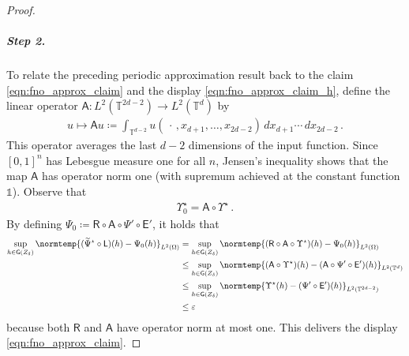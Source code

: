 \documentclass[pdflatex,sn-mathphys-num]{sn-jnl-preprint}
\newcommand{\T}{\mathbb{T}}
\newcommand{\sfA}{\mathsf{A}}
\newcommand{\sfE}{\mathsf{E}}
\newcommand{\sfG}{\mathsf{G}}
\newcommand{\sfL}{\mathsf{L}}
\newcommand{\sfR}{\mathsf{R}}
\newcommand{\norm}{\normtemp}
\newcommand{\defeq}{\coloneqq} %
\newcommand{\diff}{d}
\newcommand{\dd}[1]{\,\diff{#1}}
\newcommand{\onebm}{\mathds{1}} %
\newcommand{\ep}{\varepsilon}
\newcommand{\slot}{{\,\cdot\,}}
\theoremstyle{thmstyleone}%
\theoremstyle{thmstyletwo}%
\theoremstyle{thmstylethree}%
\numberwithin{equation}{section}
\numberwithin{theorem}{section}
\begin{document}
\begin{proof}
    \subparagraph*{\emph{\textbf{Step 2.}}}
    To relate the preceding periodic approximation result back to the claim \eqref{eqn:fno_approx_claim} and the display \eqref{eqn:fno_approx_claim_h}, define the linear operator $\sfA\colon L^2(\T^{2d-2})\to L^2(\T^d)$ by
    \begin{align*}
        u\mapsto \sfA u\defeq \int_{\T^{d-2}}u(\slot, x_{d+1},\ldots, x_{2d-2})\dd{x_{d+1}}\cdots \dd{x_{2d-2}}\,.
    \end{align*}
    This operator averages the last $d-2$ dimensions of the input function. Since $[0,1]^n$ has Lebesgue measure one for all $n$, Jensen's inequality shows that the map $\sfA$ has operator norm one (with supremum achieved at the constant function $\onebm$). 
    Observe that 
    \begin{align*}
        \Upsilon_0^\star=\sfA\circ \Upsilon^\star\,.
    \end{align*}
    By defining $\Psi_0\defeq \sfR\circ\sfA\circ\Psi'\circ\sfE'$, it holds that
    \begin{align*}
    \sup_{h\in \sfG(Z_\delta)}\norm{(\widetilde{\Psi}^\star\circ \sfL)(h)-\Psi_0(h)}_{L^2(\Omega)}&=\sup_{h\in \sfG(Z_\delta)}\norm{(\sfR\circ\sfA\circ\Upsilon^\star)(h)-\Psi_0(h)}_{L^2(\Omega)}\\
        &\leq \sup_{h\in \sfG(Z_\delta)}\norm{(\sfA\circ\Upsilon^\star)(h)-(\sfA\circ\Psi'\circ\sfE')(h)}_{L^2(\T^d)}\\
        &\leq \sup_{h\in \sfG(Z_\delta)}\norm{\Upsilon^\star(h)-(\Psi'\circ\sfE')(h)}_{L^2(\T^{2d-2})}\\
        &\leq \ep
    \end{align*}
    because both $\sfR$ and $\sfA$ have operator norm at most one. This delivers the display \eqref{eqn:fno_approx_claim}.


\end{proof}
\end{document}
